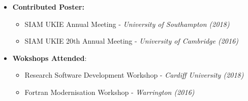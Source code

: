 \documentclass[11pt,a4paper,sans]{moderncv}        %
\begin{document}
\begin{itemize}
\vspace{6pt}

\item{\textbf{Contributed Poster:}
\begin{itemize}
\item SIAM UKIE Annual Meeting - \textit{University of Southampton (2018)}
\vspace{3pt}
\item SIAM UKIE 20th Annual Meeting - \textit{University of Cambridge (2016)}
\end{itemize}}

\vspace{6pt}

\item{\textbf{Wokshops Attended}:
\begin{itemize}
\vspace{3pt}
\item Research Software Development Workshop - \textit{Cardiff University (2018)}
\vspace{3pt}
\item Fortran Modernisation Workshop - \textit{Warrington (2016)}
\vspace{3pt}
\end{itemize}}

\vspace{6pt}

\end{itemize}
\end{document}

